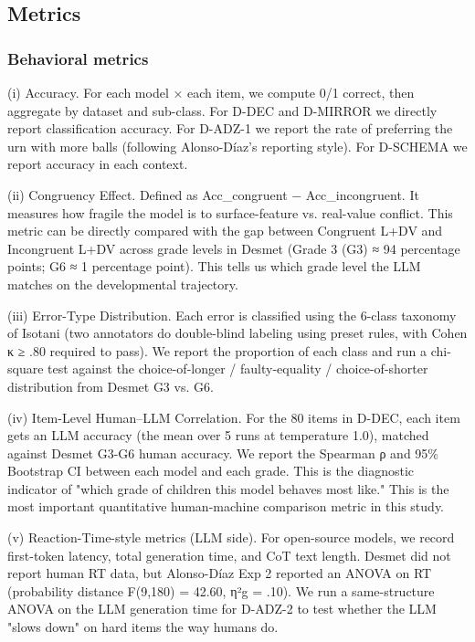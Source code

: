 \subsection{Metrics}

\subsubsection{Behavioral metrics}

(i) Accuracy. For each model × each item, we compute 0/1 correct, then aggregate by dataset and sub-class. For D-DEC and D-MIRROR we directly report classification accuracy. For D-ADZ-1 we report the rate of preferring the urn with more balls (following Alonso-Díaz's reporting style). For D-SCHEMA we report accuracy in each context.

(ii) Congruency Effect. Defined as Acc\_congruent − Acc\_incongruent. It measures how fragile the model is to surface-feature vs. real-value conflict. This metric can be directly compared with the gap between Congruent L+DV and Incongruent L+DV across grade levels in Desmet\cite{desmet2010} (Grade 3 (G3) ≈ 94 percentage points; G6 ≈ 1 percentage point). This tells us which grade level the LLM matches on the developmental trajectory.

(iii) Error-Type Distribution. Each error is classified using the 6-class taxonomy of Isotani\cite{isotani2010} (two annotators do double-blind labeling using preset rules, with Cohen κ ≥ .80 required to pass). We report the proportion of each class and run a chi-square test against the choice-of-longer / faulty-equality / choice-of-shorter distribution from Desmet G3 vs. G6.

(iv) Item-Level Human–LLM Correlation. For the 80 items in D-DEC, each item gets an LLM accuracy (the mean over 5 runs at temperature 1.0), matched against Desmet G3-G6 human accuracy. We report the Spearman ρ and 95\% Bootstrap CI between each model and each grade. This is the diagnostic indicator of "which grade of children this model behaves most like." This is the most important quantitative human-machine comparison metric in this study.

(v) Reaction-Time-style metrics (LLM side). For open-source models, we record first-token latency, total generation time, and CoT text length. Desmet did not report human RT data, but Alonso-Díaz Exp 2 reported an ANOVA on RT (probability distance F(9,180) = 42.60, η²g = .10). We run a same-structure ANOVA on the LLM generation time for D-ADZ-2 to test whether the LLM "slows down" on hard items the way humans do.

